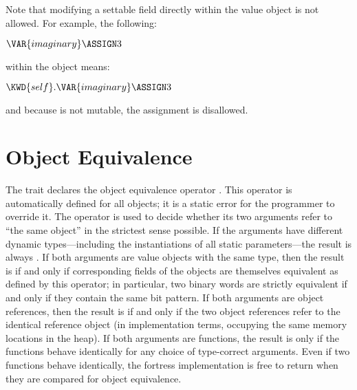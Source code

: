 Note that modifying a settable field directly within the value object is
not allowed.  For example, the following:
\begin{Fortress}
\(\VAR{imaginary} \ASSIGN 3\)
\end{Fortress}
within the  object means:
\begin{Fortress}
\(\mathord{\KWD{self}}.\VAR{imaginary} \ASSIGN 3\)
\end{Fortress}
and because  is not mutable, the assignment is
disallowed.


\section{Object Equivalence}

The trait  declares the object equivalence operator
\EXP{\sequiv}.  This operator is automatically defined for all
objects; it is a static error for the programmer to override it.  The
\EXP{\sequiv} operator is used to decide whether its two arguments
refer to ``the same object'' in the strictest sense possible.  If the
arguments have different dynamic types---including the instantiations
of all static parameters---the result is always .  If both
arguments are value objects with the same type, then the result is
 if and only if corresponding fields of the objects are
themselves equivalent as defined by this operator; in particular, two
binary words are strictly equivalent if and only if they contain the
same bit pattern.  If both arguments are object references, then the
result is  if and only if the two object references refer to
the identical reference object (in implementation terms, occupying the
same memory locations in the heap).  If both arguments are functions,
the result is  only if the functions behave identically for
any choice of type-correct arguments.  Even if two functions behave
identically, the fortress implementation is free to return 
when they are compared for object equivalence.
